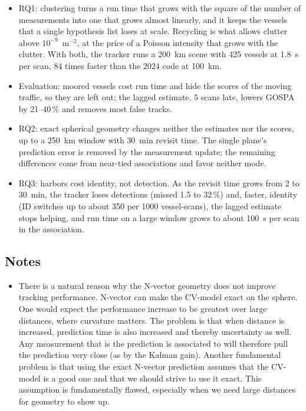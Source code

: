 \begin{itemize}
    \item RQ1: clustering turns a run time that grows with the square of the number of measurements into one that grows almost linearly, and it keeps the vessels that a single hypothesis list loses at scale. Recycling is what allows clutter above $10^{-9}$~m$^{-2}$, at the price of a Poisson intensity that grows with the clutter. With both, the tracker runs a 200~km scene with 425 vessels at 1.8~s per scan, 84 times faster than the 2024 code at 100~km.
    \item Evaluation: moored vessels cost run time and hide the scores of the moving traffic, so they are left out; the lagged estimate, 5 scans late, lowers GOSPA by 21--40\,\% and removes most false tracks.
    \item RQ2: exact spherical geometry changes neither the estimates nor the scores, up to a 250~km window with 30~min revisit time. The single plane's prediction error is removed by the measurement update; the remaining differences come from near-tied associations and favor neither mode.
    \item RQ3: harbors cost identity, not detection. As the revisit time grows from 2 to 30~min, the tracker loses detections (missed 1.5 to 32\,\%) and, faster, identity (ID switches up to about 350 per 1000 vessel-scans), the lagged estimate stops helping, and run time on a large window grows to about 100~s per scan in the association.
\end{itemize}

\subsection{Notes}
\begin{itemize}
    \item There is a natural reason why the N-vector geometry does not improve tracking performance. N-vector can make the CV-model exact on the sphere. One would expect the performance increase to be greatest over large distances, where curvature matters. The problem is that when distance is increased, prediction time is also increased and thereby uncertainty as well. Any measurement that is the prediction is associated to will therefore pull the prediction very close (as by the Kalman gain). Another fundamental problem is that using the exact N-vector prediction assumes that the CV-model is a good one and that we should strive to use it exact. This assumption is fundamentally flawed, especially when we need large distances for geometry to show up.
\end{itemize}
